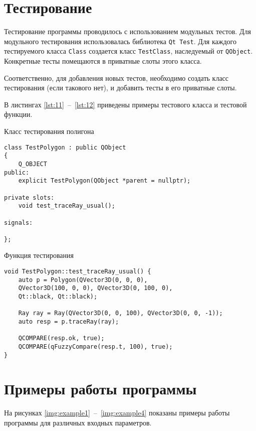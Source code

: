 \section{Тестирование}

Тестирование программы проводилось с использованием модульных тестов. 
Для модульного тестирования использовалась библиотека \texttt{Qt Test}.
Для каждого тестируемого класса \texttt{Class} создается класс \texttt{TestClass}, наследуемый от \texttt{QObject}. Конкретные тесты помещаются в приватные слоты этого класса.

Соответственно, для добавления новых тестов, необходимо создать класс тестирования (если такового нет), и добавить тесты в его приватные слоты.

В листингах \ref{lst:11}~--~\ref{lst:12} приведены примеры тестового класса и тестовой функции.

\begin{code}
\caption{Класс тестирования полигона}
\label{lst:11}
\begin{verbatim}
class TestPolygon : public QObject
{
    Q_OBJECT
public:
    explicit TestPolygon(QObject *parent = nullptr);

private slots:
    void test_traceRay_usual();

signals:

};
\end{verbatim}
\end{code}

\begin{code}
\caption{Функция тестирования}
\label{lst:12}
\begin{verbatim}
void TestPolygon::test_traceRay_usual() {
    auto p = Polygon(QVector3D(0, 0, 0), 
    QVector3D(100, 0, 0), QVector3D(0, 100, 0), 
    Qt::black, Qt::black);

    Ray ray = Ray(QVector3D(0, 0, 100), QVector3D(0, 0, -1));
    auto resp = p.traceRay(ray);

    QCOMPARE(resp.ok, true);
    QCOMPARE(qFuzzyCompare(resp.t, 100), true);
}
\end{verbatim}
\end{code}

\section{Примеры работы программы}
На рисунках \ref{img:example1}~--~\ref{img:example4} показаны примеры работы программы для различных входных параметров.

\newpage 

